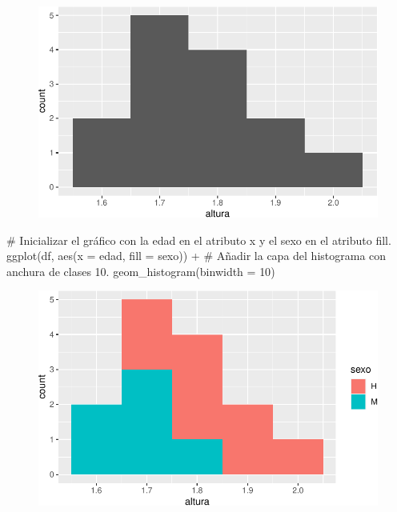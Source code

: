 \documentclass[
  a4paper,
]{scrreport}
\newenvironment{Shaded}{\begin{snugshade}}{\end{snugshade}}
\newcommand{\AttributeTok}[1]{\textcolor[rgb]{0.40,0.45,0.13}{#1}}
\newcommand{\CommentTok}[1]{\textcolor[rgb]{0.37,0.37,0.37}{#1}}
\newcommand{\DecValTok}[1]{\textcolor[rgb]{0.68,0.00,0.00}{#1}}
\newcommand{\FunctionTok}[1]{\textcolor[rgb]{0.28,0.35,0.67}{#1}}
\newcommand{\NormalTok}[1]{\textcolor[rgb]{0.00,0.23,0.31}{#1}}
\newcommand{\SpecialCharTok}[1]{\textcolor[rgb]{0.37,0.37,0.37}{#1}}
\theoremstyle{definition}
\theoremstyle{definition}
\theoremstyle{remark}
\begin{document}
\begin{figure}[H]

{\centering \includegraphics{./07-graficos_files/figure-pdf/unnamed-chunk-16-1.pdf}

}

\end{figure}

\begin{Shaded}
\begin{Highlighting}[]
\CommentTok{\# Inicializar el gráfico con la edad en el atributo x y el sexo en el atributo fill.}
\FunctionTok{ggplot}\NormalTok{(df, }\FunctionTok{aes}\NormalTok{(}\AttributeTok{x =}\NormalTok{ edad, }\AttributeTok{fill =}\NormalTok{ sexo)) }\SpecialCharTok{+}
\CommentTok{\# Añadir la capa del histograma con anchura de clases 10.}
    \FunctionTok{geom\_histogram}\NormalTok{(}\AttributeTok{binwidth =} \DecValTok{10}\NormalTok{)}
\end{Highlighting}
\end{Shaded}

\begin{figure}[H]

{\centering \includegraphics{./07-graficos_files/figure-pdf/unnamed-chunk-17-1.pdf}

}

\end{figure}
\end{document}
